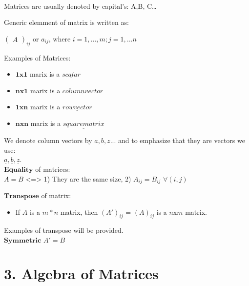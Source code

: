 \documentclass[]{article}
\providecommand{\tightlist}{%
  \setlength{\itemsep}{0pt}\setlength{\parskip}{0pt}}
\begin{document}
~

Matrices are usually denoted by capital's: A,B, C\ldots{}

Generic elemment of matrix is written as:

\begin{center}
$\begin{pmatrix}A\end{pmatrix}_{ij}$ or $a_{ij}$, where  $i=1,...,m ; j=1,...n$
\end{center}

Examples of Matrices:

\begin{itemize}
\item
  \(\mathbf{1x1}\) marix is a \(\underline{scalar}\)
\item
  \(\mathbf{nx1}\) marix is a \(\underline{column vector}\)
\item
  \(\mathbf{1xn}\) marix is a \(\underline{row vector}\)
\item
  \(\mathbf{nxn}\) marix is a \(\underline{square matrix}\)
\end{itemize}

We denote column vectors by \(a, b, z...\) and to emphasize that they
are vectors we use:\\
 \(\underline{a}, \underline{b}, \underline{z}\).\\

\(\mathbf{Equality}\) of matrices:\\
 \(A=B\) \textless{}=\textgreater{} 1) They are the same size, 2)
\(A_{ij}=B_{ij}\) \(\forall(i,j)\)

\newpage  

\(\mathbf{Transpose}\) of matrix:

\begin{itemize}
\tightlist
\item
  If \(A\) is a \(m*n\) matrix, then \((A')_{ij}\) = \((A)_{ij}\) is a
  \(n\)x\(m\) matrix.\\
\end{itemize}

Examples of transpose will be provided.\\

\(\mathbf{Symmetric}\) \(A'=B\)\\

\section{3. Algebra of Matrices}\label{algebra-of-matrices}
\end{document}

